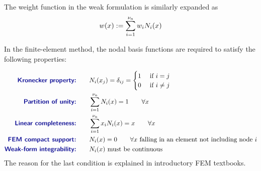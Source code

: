 The weight function in the weak formulation is similarly expanded as
\begin{equation}
  w(x):=\sum\limits_{i=1}^{{\nu_\text{n}}}w_i {N}_i(x)
\label{eq:weightc}
\end{equation}

In the finite-element method, the nodal basis functions are required to satisfy the following properties:

\begin{subequations}
\begin{align}
\text{\Defn{Kronecker property:}}\qquad&
\NBF_i(x_j)=\delta_{ij}=\begin{cases}
                                1 &\text{ if }i=j
                                \\
                                0 & \text{ if }i\ne j
                         \end{cases}
\label{eq:oneDRequirementsOnShapeFnsKronecker}
\\
\text{\Defn{Partition of unity:}}\qquad&
\sum\limits_{i=1}^\numnodes \NBF_i(x)=1     \qquad\forall x
\\
\text{\Defn{Linear completeness:}}\qquad&
\sum\limits_{i=1}^\numnodes x_i\NBF_i(x)=x     \qquad\forall x
\\
\text{\Defn{FEM compact support:}}\qquad&
\NBF_i(x)=0 \qquad\forall x 
\text{ falling in an element not including node $i$}
\label{eq:oneDRequirementsOnShapeFnsFEMsupport}
\\
\text{\Defn{Weak-form integrability:}}\qquad&
\NBF_i(x)\text{ must be continuous}
\label{eq:oneDRequirementsOnShapeFnsFEMcontinuity}
\end{align}
\label{eq:oneDRequirementsOnShapeFns}
\end{subequations}
The reason for the last condition is explained in introductory FEM textbooks.

